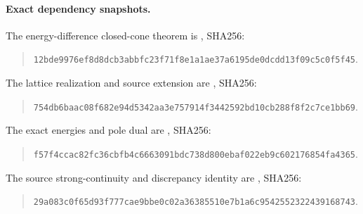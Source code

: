 \paragraph{Exact dependency snapshots.}
The energy-difference closed-cone theorem is
, SHA256:
\begin{quote}\small
\nolinkurl{12bde9976ef8d8dcb3abbfc23f71f8e1a1ae37a6195de0dcdd13f09c5c0f5f45}.
\end{quote}
The lattice realization and source extension are
, SHA256:
\begin{quote}\small
\nolinkurl{754db6baac08f682e94d5342aa3e757914f3442592bd10cb288f8f2c7ce1bb69}.
\end{quote}
The exact energies and pole dual are
, SHA256:
\begin{quote}\small
\nolinkurl{f57f4ccac82fc36cbfb4c6663091bdc738d800ebaf022eb9c602176854fa4365}.
\end{quote}
The source strong-continuity and discrepancy identity are
, SHA256:
\begin{quote}\small
\nolinkurl{29a083c0f65d93f777cae9bbe0c02a36385510e7b1a6c9542552322439168743}.
\end{quote}
